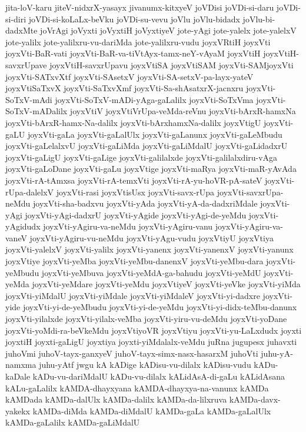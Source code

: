 {jita-loV-karu
jiteV-nidxrX-yasayx
jivanumx-kitxyeV
joVDisi
joVDi-si-daru
joVDi-si-diri
joVDi-si-koLaLx-beVku
joVDi-su-vevu
joVlu
joVlu-bidadx
joVlu-bi-dadxMte
joVrAgi
joVyxti
joVyxtiH
joVyxtiyeV
jote-yAgi
jote-yalelx
jote-yalelxV
jote-yalilx
jote-yalilxru-vu-dariMda
jote-yalilxru-vudu
joyxVRtiH
joyxVti
joyxVti-BaR-vati
joyxVti-BaR-va-tiVtAyx-tamx-neY-vAyaM
joyxVtiH
joyxVtiH-savxrUpave
joyxVtiH-savxrUpavu
joyxVtiSA
joyxVtiSAM
joyxVti-SAMjoyxVti
joyxVti-SATxvXtf
joyxVti-SAsetxV
joyxVti-SA-setxV-pa-layx-yateV
joyxVtiSaTxvX
joyxVti-SaTxvXmf
joyxVti-Sa-shAsatxrX-jacnxru
joyxVti-SoTxV-mAdi
joyxVti-SoTxV-mADi-yAga-gaLalilx
joyxVti-SoTxVma
joyxVti-SoTxV-mADalilx
joyxVtiV
joyxVtiVrUpa-veMda-reVnu
joyxVti-bArxR-hamxNa
joyxVti-bArxR-hamx-Na-dalilx
joyxVti-bArxhamxNa-dalilx
joyxVtigU
joyxVti-gaLU
joyxVti-gaLa
joyxVti-gaLalUlx
joyxVti-gaLanunx
joyxVti-gaLeMbudu
joyxVti-gaLelalxvU
joyxVti-gaLiMda
joyxVti-gaLiMdalU
joyxVti-gaLidadxrU
joyxVti-gaLigU
joyxVti-gaLige
joyxVti-galilalxde
joyxVti-galilalxdiru-vAga
joyxVti-gaLoDane
joyxVti-gaLu
joyxVtige
joyxVti-maRya
joyxVti-maR-yAvAda
joyxVti-rA-tAmxsa
joyxVti-rA-temxVti
joyxVti-rA-yu-hoVR-pA-sateV
joyxVti-rUpa-dalelxV
joyxVti-rasi
joyxVtisUsx
joyxVti-savx-rUpa
joyxVti-savxrUpa-neMdu
joyxVti-sha-badxvu
joyxVti-yAda
joyxVti-yA-da-dadxriMdale
joyxVti-yAgi
joyxVti-yAgi-dadxrU
joyxVti-yAgide
joyxVti-yAgi-de-yeMdu
joyxVti-yAgidudx
joyxVti-yAgiru-va-neMdu
joyxVti-yAgiru-vanu
joyxVti-yAgiru-va-vaneV
joyxVti-yAgiru-vu-neMdu
joyxVti-yAgu-vudu
joyxVtiyU
joyxVtiya
joyxVti-yalelxV
joyxVti-yalilx
joyxVti-yanenx
joyxVti-yanenxV
joyxVti-yanunx
joyxVtiye
joyxVti-yeMba
joyxVti-yeMbu-danenxV
joyxVti-yeMbu-dara
joyxVti-yeMbudu
joyxVti-yeMbuva
joyxVti-yeMdA-ga-bahudu
joyxVti-yeMdU
joyxVti-yeMda
joyxVti-yeMdare
joyxVti-yeMdu
joyxVtiyeV
joyxVti-yeVke
joyxVti-yiMda
joyxVti-yiMdalU
joyxVti-yiMdale
joyxVti-yiMdaleV
joyxVti-yi-dadxre
joyxVti-yide
joyxVti-yi-de-yeMbudu
joyxVti-yi-de-yeMdu
joyxVti-yi-didx-teMbu-danunx
joyxVti-yilalxde
joyxVti-yilalx-veMba
joyxVti-yiru-vu-deMdu
joyxVti-yoDane
joyxVti-yoMdi-ra-beVkeMdu
joyxVtiyoVR
joyxVtiyu
joyxVti-yu-LaLxdudx
joyxti
joyxtiH
joyxti-gaLigU
joyxtiya
joyxti-yiMdalalx-veMdu
juRna
jugupesx
juhavxti
juhoVmi
juhoV-tayx-ganxyeV
juhoV-tayx-simx-nasx-hasarxM
juhoVti
juhu-yA-namxma
juhu-yAtf
jwgu
kA
kADige
kADisu-vu-dilalx
kADisu-vudu
kADu-kaDale
kADu-vu-dariMdalU
kADu-vu-dilalx
kALidAsA-di-gaLu
kALidAsana
kALu-gaLalilx
kAMDA-dhayxyana
kAMDA-dhayxya-na-vanunx
kAMDa
kAMDada
kAMDa-dalUlx
kAMDa-dalilx
kAMDa-da-lilxruva
kAMDa-davx-yakekx
kAMDa-diMda
kAMDa-diMdalU
kAMDa-gaLa
kAMDa-gaLalUlx
kAMDa-gaLalilx
kAMDa-gaLiMdalU
}
